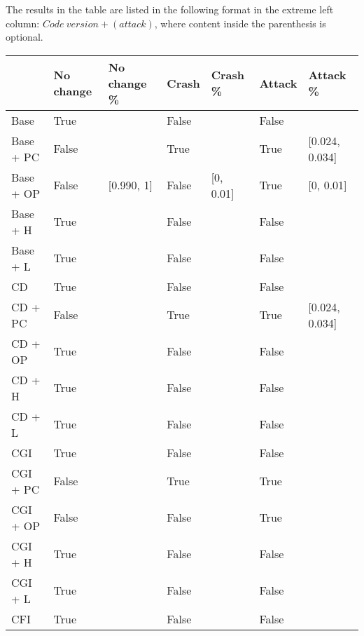 The results in the table are listed in the following format in the extreme left column: $Code\:version + (attack)$, where content inside the parenthesis is optional.

\begin{table}[H]
    \begin{tabular}{l|l|l|l|l|l|l}
    ~         & No change & No change \% & Crash & Crash \% & Attack & Attack \% \\ \hline
    Base      & True &\relax[0.990, 1] & False & \relax[0, 0.01] & False & \relax[0, 0.01] ~    \\
    Base + PC & False & \relax[0.854, 0.864] & True & \relax[0.108, 0.118] & True & [0.024, 0.034]    \\
    Base + OP & False & [0.990, 1] & False & [0, 0.01] & True & [0, 0.01]    \\
    Base + H  & True &\relax[0.990, 1] & False & \relax[0, 0.01] & False & \relax[0, 0.01]    \\
    Base + L  & True &\relax[0.990, 1] & False & \relax[0, 0.01] & False & \relax[0, 0.01]    \\
    CD        & True &\relax[0.990, 1] & False & \relax[0, 0.01] & False & \relax[0, 0.01]    \\
    CD + PC   & False & \relax[0.853, 0.863] & True & \relax[0.108, 0.118] & True & [0.024, 0.034]     \\
    CD + OP   & True &\relax[0.990, 1] & False & \relax[0, 0.01] & False & \relax[0, 0.01]   \\
    CD + H    & True &\relax[0.990, 1] & False & \relax[0, 0.01] & False & \relax[0, 0.01]   \\
    CD + L    & True &\relax[0.990, 1] & False & \relax[0, 0.01] & False & \relax[0, 0.01]   \\
    CGI       & True &\relax[0.990, 1] & False & \relax[0, 0.01] & False & \relax[0, 0.01]   \\
    CGI + PC  & False & \relax[0.723, 0.733] & True & \relax[0.227, 0.237] & True & \relax[0.031, 0.041]   \\
    CGI + OP  & False & \relax[0.990, 1] & False & \relax[0, 0.01] & True & \relax[0, 0.01]     \\
    CGI + H   & True &\relax[0.990, 1] & False & \relax[0, 0.01] & False & \relax[0,0.01]   \\
    CGI + L   & True & \relax[0.990, 1] & False & \relax[0, 0.01] & False & \relax[0,0.01] \\
    CFI       & True &\relax[0.990, 1] & False & \relax[0, 0.01] & False & \relax[0,0.01]    \\

\end{tabular}
\end{table}
